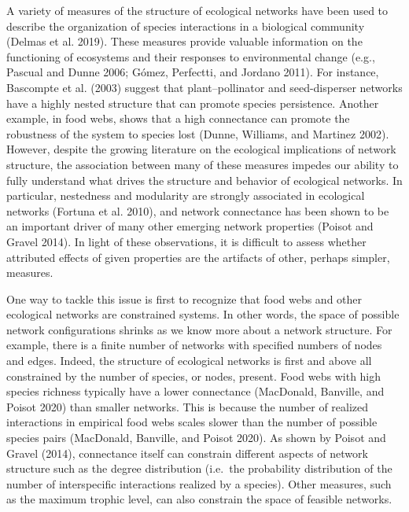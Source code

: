 \documentclass[10pt,oneside]{article}
\begin{document}
A variety of measures of the structure of ecological networks have been
used to describe the organization of species interactions in a
biological community (Delmas et al. 2019). These measures provide
valuable information on the functioning of ecosystems and their
responses to environmental change (e.g., Pascual and Dunne 2006; Gómez,
Perfectti, and Jordano 2011). For instance, Bascompte et al. (2003)
suggest that plant--pollinator and seed-disperser networks have a highly
nested structure that can promote species persistence. Another example,
in food webs, shows that a high connectance can promote the robustness
of the system to species lost (Dunne, Williams, and Martinez 2002).
However, despite the growing literature on the ecological implications
of network structure, the association between many of these measures
impedes our ability to fully understand what drives the structure and
behavior of ecological networks. In particular, nestedness and
modularity are strongly associated in ecological networks (Fortuna et
al. 2010), and network connectance has been shown to be an important
driver of many other emerging network properties (Poisot and Gravel
2014). In light of these observations, it is difficult to assess whether
attributed effects of given properties are the artifacts of other,
perhaps simpler, measures.

One way to tackle this issue is first to recognize that food webs and
other ecological networks are constrained systems. In other words, the
space of possible network configurations shrinks as we know more about a
network structure. For example, there is a finite number of networks
with specified numbers of nodes and edges. Indeed, the structure of
ecological networks is first and above all constrained by the number of
species, or nodes, present. Food webs with high species richness
typically have a lower connectance (MacDonald, Banville, and Poisot
2020) than smaller networks. This is because the number of realized
interactions in empirical food webs scales slower than the number of
possible species pairs (MacDonald, Banville, and Poisot 2020). As shown
by Poisot and Gravel (2014), connectance itself can constrain different
aspects of network structure such as the degree distribution (i.e.~the
probability distribution of the number of interspecific interactions
realized by a species). Other measures, such as the maximum trophic
level, can also constrain the space of feasible networks.
\end{document}
